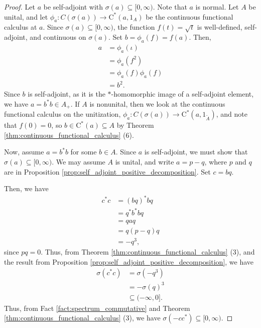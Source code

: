 \begin{proof}
  Let $a$ be self-adjoint with $\sigma\left( a \right)\subseteq [0,\infty)$. Note that $a$ is normal. Let $A$ be unital, and let $\phi_a\colon C\left( \sigma\left( a \right) \right)\rightarrow \mathrm{C}^{\ast}\left( a,1_A \right)$ be the continuous functional calculus at $a$. Since $\sigma\left( a \right)\subseteq [0,\infty)$, the function $f\left( t \right) = \sqrt{t}$ is well-defined, self-adjoint, and continuous on $\sigma\left( a \right)$. Set $b = \phi_a\left( f \right) = f(a)$. Then,
  \begin{align*}
    a &= \phi_a\left( \iota \right)\\
      &= \phi_a\left( f^2 \right)\\
      &= \phi_a\left( f \right)\phi_a\left( f \right)\\
      &= b^2.
  \end{align*}
  Since $b$ is self-adjoint, as it is the $\ast$-homomorphic image of a self-adjoint element, we have $a = b^{\ast}b\in A_{+}$. If $A$ is nonunital, then we look at the continuous functional calculus on the unitization, $\phi_a\colon C\left( \sigma\left( a \right) \right)\rightarrow \mathrm{C}^{\ast}\left( a,1_{\widetilde{A}} \right)$, and note that $f(0) = 0$, so $b\in \mathrm{C}^{\ast}\left( a \right)\subseteq A$ by Theorem \ref{thm:continuous_functional_calculus} (6).\newline

  Now, assume $a = b^{\ast}b$ for some $b\in A$. Since $a$ is self-adjoint, we must show that $\sigma\left( a \right)\subseteq [0,\infty)$. We may assume $A$ is unital, and write $a = p-q$, where $p$ and $q$ are in Proposition \ref{prop:self_adjoint_positive_decomposition}. Set $c = bq$.\newline

  Then, we have
  \begin{align*}
    c^{\ast}c &= \left( bq \right)^{\ast}bq\\
              &= q^{\ast}b^{\ast}bq\\
              &= qaq\\
              &= q\left( p-q \right)q\\
              &= -q^3,
  \end{align*}
  since $pq = 0$. Thus, from Theorem \ref{thm:continuous_functional_calculus} (3), and the result from Proposition \ref{prop:self_adjoint_positive_decomposition}, we have
  \begin{align*}
    \sigma\left( c^{\ast}c \right)&=\sigma\left( -q^3 \right)\\
                                  &= -\sigma\left( q \right)^3\\
                                  &\subseteq (-\infty,0].
  \end{align*}
  Thus, from Fact \ref{fact:spectrum_commutative} and Theorem \ref{thm:continuous_functional_calculus} (3), we have $\sigma\left( -cc^{\ast} \right)\subseteq [0,\infty)$.\newline


\end{proof}
